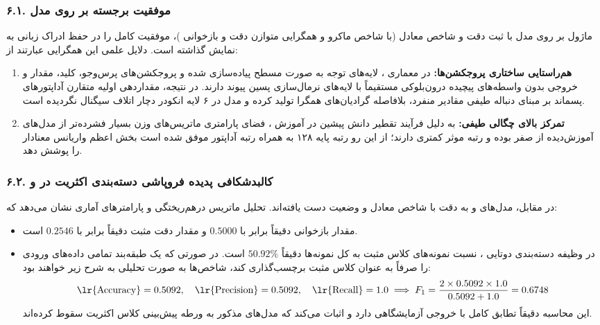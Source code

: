 \subsubsection*{۶.۱. موفقیت برجسته بر روی مدل }
ماژول  بر روی مدل  با ثبت دقت  و شاخص  معادل  (با شاخص ماکرو  و همگرایی متوازن دقت  و بازخوانی )، موفقیت کامل  را در حفظ ادراک زبانی به نمایش گذاشته است. دلایل علمی این همگرایی عبارتند از:
\begin{enumerate}
    \item \textbf{هم‌راستایی ساختاری پروجکشن‌ها:} در معماری ، لایه‌های توجه به صورت مسطح پیاده‌سازی شده و پروجکشن‌های پرس‌وجو، کلید، مقدار و خروجی بدون واسطه‌های پیچیده درون‌بلوکی مستقیماً با لایه‌های نرمال‌سازی پسین پیوند دارند. در نتیجه، مقداردهی اولیه متقارن آداپتورهای پسماند بر مبنای دنباله طیفی مقادیر منفرد، بلافاصله گرادیان‌های همگرا تولید کرده و مدل در ۶ لایه انکودر دچار اتلاف سیگنال نگردیده است.
    \item \textbf{تمرکز بالای چگالی طیفی:} به دلیل فرآیند تقطیر دانش پیشین در آموزش ، فضای پارامتری ماتریس‌های وزن بسیار فشرده‌تر از مدل‌های آموزش‌دیده از صفر بوده و رتبه موثر کمتری دارند؛ از این رو رتبه پایه ۱۲۸ به همراه رتبه آداپتور موفق شده است بخش اعظم واریانس معنادار را پوشش دهد.
\end{enumerate}

\subsubsection*{۶.۲. کالبدشکافی پدیده فروپاشی دسته‌بندی اکثریت در  و }
در مقابل، مدل‌های  و  به دقت  با شاخص  معادل  و وضعیت  دست یافته‌اند. تحلیل ماتریس درهم‌ریختگی و پارامترهای آماری نشان می‌دهد که:
\begin{itemize}
    \item مقدار بازخوانی  دقیقاً برابر با $0.5000$ و مقدار دقت مثبت  دقیقاً برابر با $0.2546$ است.
    \item در وظیفه دسته‌بندی دوتایی ، نسبت نمونه‌های کلاس مثبت به کل نمونه‌ها دقیقاً $50.92\%$ است. در صورتی که یک طبقه‌بند تمامی داده‌های ورودی را صرفاً به عنوان کلاس مثبت برچسب‌گذاری کند، شاخص‌ها به صورت تحلیلی به شرح زیر خواهند بود:
    \begin{equation}
    \text{\lr{Accuracy}} = 0.5092, \quad \text{\lr{Precision}} = 0.5092, \quad \text{\lr{Recall}} = 1.0 \implies F_1 = \frac{2 \times 0.5092 \times 1.0}{0.5092 + 1.0} = 0.6748
    \end{equation}
    این محاسبه دقیقاً تطابق کامل با خروجی آزمایشگاهی دارد و اثبات می‌کند که مدل‌های مذکور به ورطه پیش‌بینی کلاس اکثریت  سقوط کرده‌اند.
\end{itemize}

